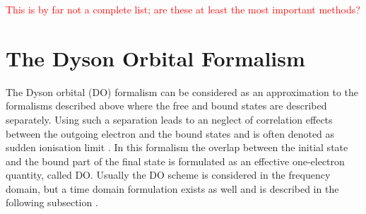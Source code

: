 {\textcolor{red}{This is by far not a complete list; are these at least the most important methods?}


\section{The Dyson Orbital Formalism}
\label{ch:do}
The Dyson orbital (DO) formalism can be considered as an approximation to the formalisms described above where the free and bound states are described separately.
Using such a separation leads to an neglect of correlation effects between the outgoing electron and the bound states and is often denoted as sudden ionisation limit \cite{ezDyson,MAgg}.
In this formalism the overlap between the initial state and the bound part of the final state is formulated as an effective one-electron quantity, called DO.
Usually the DO scheme is considered in the frequency domain, but a time domain formulation exists as well and is described in the following subsection \cite{TD-do}.

}

